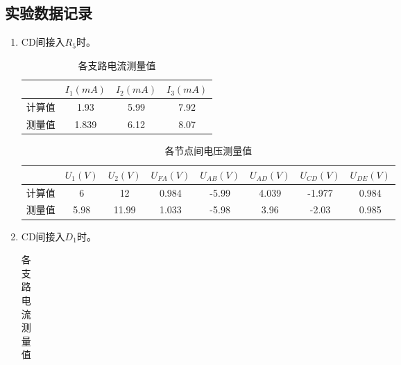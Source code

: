 \documentclass{../source/Experiment}
\begin{document}
        \subsection{实验数据记录}
            \begin{enumerate}
                \item CD间接入$R_5$时。
                \begin{table}[htbp]
                    \begin{center}
                    \caption{各支路电流测量值}
                    \begin{tabular}{|c|c|c|c|}
                    \hline
                        & $I_{1}(mA)$ & $I_{2}(mA)$ & $I_{3}(mA)$ \\
                    \hline
                    计算值 & 1.93 & 5.99 & 7.92 \\
                    \hline
                    测量值 & 1.839 & 6.12 & 8.07 \\
                    \hline
                    \end{tabular} 
                    \end{center}
                \end{table}
                \begin{table}[htbp]
                    \begin{center}
                    \caption{各节点间电压测量值}
                    \begin{tabular}{|c|c|c|c|c|c|c|c|}
                        \hline
                            & $U_{1}(V)$ & $U_{2}(V)$ & $U_{FA}(V)$ & $U_{AB}(V)$ & $U_{AD}(V)$ & $U_{CD}(V)$ & $U_{DE}(V)$ \\
                        \hline
                        计算值 & 6&12 & 0.984 & -5.99 & 4.039 & -1.977 & 0.984 \\
                        \hline
                        测量值 & 5.98 & 11.99 & 1.033 & -5.98 & 3.96 & -2.03 & 0.985 \\
                        \hline
                        \end{tabular}
                    \end{center}
                \end{table}
                \item CD间接入$D_1$时。
                \begin{table}[htbp]
                    \begin{center}
                    \caption{各支路电流测量值}
                    \begin{tabular}{|c|c|c|c|}

\end{tabular}
\end{center}
\end{table}
\end{enumerate}
\end{document}
